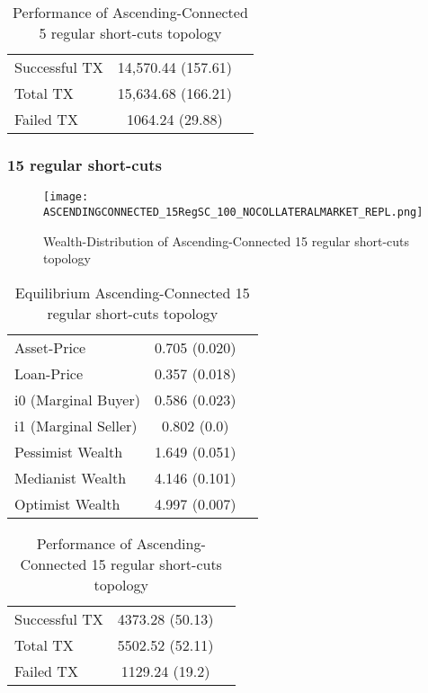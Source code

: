 \documentclass[Bachelorarbeit.tex]{subfiles}
\begin{document}
\begin{table}[H]
	\caption{Performance of Ascending-Connected 5 regular short-cuts topology}
	\centering
	\begin{tabular} { l c r }
		\hline
		Successful TX & 14,570.44 (157.61) \\
		Total TX & 15,634.68 (166.21) \\
		Failed TX & 1064.24 (29.88) \\
		\hline
	\end{tabular}
\end{table}

\subsubsection{15 regular short-cuts}
\begin{figure}[H]
	\centering
  \texttt{[image: ASCENDINGCONNECTED\_15RegSC\_100\_NOCOLLATERALMARKET\_REPL.png]}
	\caption{Wealth-Distribution of Ascending-Connected 15 regular short-cuts topology}
	\label{fig1}
\end{figure}

\begin{table}[H]
	\caption{Equilibrium Ascending-Connected 15 regular short-cuts topology}
	\centering
	\begin{tabular} { l c r }
		\hline
		Asset-Price & 0.705 (0.020) \\
		Loan-Price & 0.357 (0.018) \\
		i0 (Marginal Buyer) & 0.586 (0.023) \\
		i1 (Marginal Seller) & 0.802 (0.0) \\
		Pessimist Wealth & 1.649 (0.051) \\
		Medianist Wealth & 4.146 (0.101) \\
		Optimist Wealth & 4.997 (0.007) \\
		\hline
	\end{tabular}
\end{table} 

\begin{table}[H]
	\caption{Performance of Ascending-Connected 15 regular short-cuts topology}
	\centering
	\begin{tabular} { l c r }
		\hline
		Successful TX & 4373.28 (50.13) \\
		Total TX & 5502.52 (52.11) \\
		Failed TX & 1129.24 (19.2) \\
		\hline
	\end{tabular}
\end{table}
\end{document}
